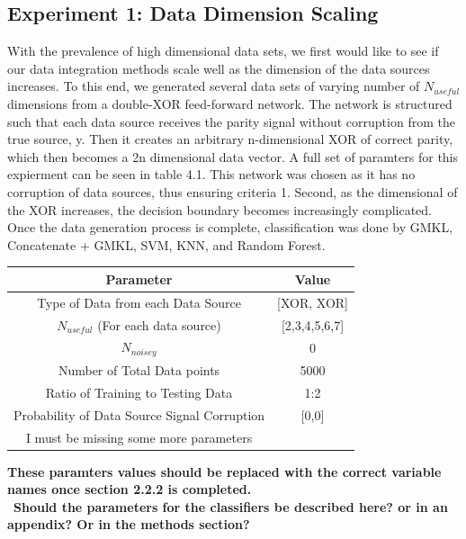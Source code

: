 \documentclass{article}
\begin{document}
\subsection{Experiment 1: Data Dimension Scaling}
With the prevalence of high dimensional data sets, we first would like to see if our data integration methods scale well as the dimension of the data sources increases. To this end, we generated several data sets of varying number of $N_{useful}$ dimensions from a double-XOR feed-forward network. The network is structured such that each data source receives the parity signal without corruption from the true source, y. Then it creates an arbitrary n-dimensional XOR of correct parity, which then becomes a 2n dimensional data vector.  A full set of paramters for this expierment can be seen in table 4.1. This network was chosen as it has no corruption of data sources, thus ensuring criteria 1. Second, as the dimensional of the XOR increases, the decision boundary becomes increasingly complicated. Once the data generation process is complete, classification was done by GMKL, Concatenate + GMKL, SVM, KNN, and Random Forest.
\begin{table}[h!]
\centering
 \begin{tabular}{|c c|} 
 \hline
Parameter & Value \\ 
\hline
Type of Data from each Data Source & [XOR, XOR]\\
$N_{useful}$ (For each data source) & [2,3,4,5,6,7] \\
$N_{noisey}$& 0\\
Number of Total Data points & 5000\\
Ratio of Training to Testing Data & 1:2\\
Probability of Data Source Signal Corruption & [0,0]\\
I must be missing some more parameters\\
\hline
 \end{tabular}
\end{table}
\textbf{These paramters values should be replaced with the correct variable names once section 2.2.2 is completed. }\\\
\textbf{Should the parameters for the classifiers be described here? or in an appendix? Or in the methods section? }
\end{document}
